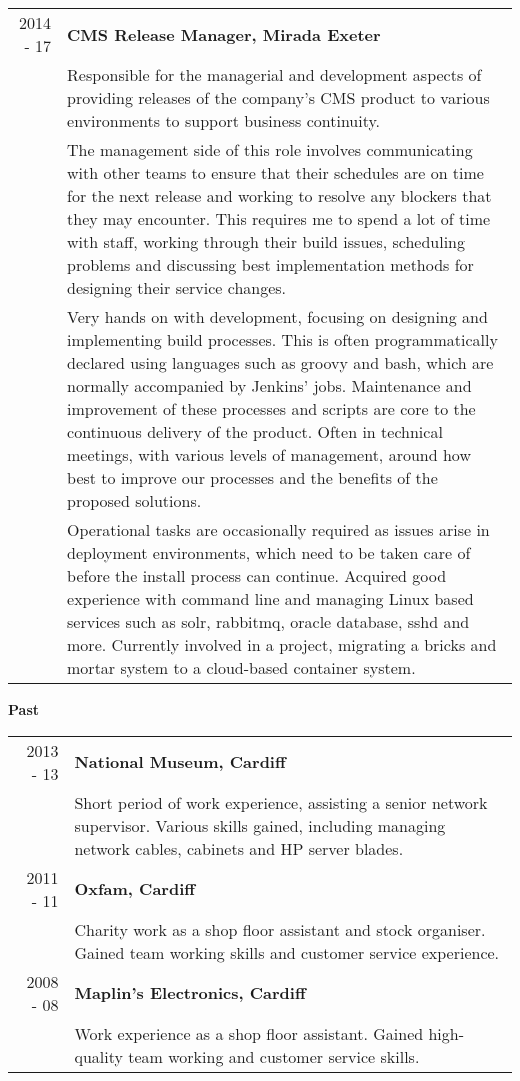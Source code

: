 \documentclass[a4paper,12pt,final,sans]{memoir}
\begin{document}
\begin{longtable}{r p{16cm}}
2014 - 17 & \textbf{\textsf{\color{head} \textsc{CMS} Release Manager, Mirada Exeter}}\\[0.3em]
& Responsible for the managerial and development aspects of providing releases of the company's CMS product to various environments to support business continuity.  \\[0.4em]
    
& The management side of this role involves communicating with other teams to ensure that their schedules are on time for the next release and working to resolve any blockers that they may encounter. This requires me to spend a lot of time with staff, working through their build issues, scheduling problems and discussing best implementation methods for designing their service changes.  \\[0.4em]
    
& Very hands on with development, focusing on designing and implementing build processes. This is often programmatically declared using languages such as groovy and bash, which are normally accompanied by Jenkins' jobs. Maintenance and improvement of these processes and scripts are core to the continuous delivery of the product. Often in technical meetings, with various levels of management, around how best to improve our processes and the benefits of the proposed solutions.  \\[0.4em]

& Operational tasks are occasionally required as issues arise in deployment environments, which need to be taken care of before the install process can continue. Acquired good experience with command line and managing Linux based services such as solr, rabbitmq, oracle database, sshd and more. Currently involved in a project, migrating a bricks and mortar system to a cloud-based container system.
	\\[-1.4em]
	
\end{longtable}

\newpage
\textbf{\textsf{\color{head} Past}} \\[-1.5em]
\begin{longtable}{r p{16cm}}
2013 - 13 & \textbf{\textsf{\color{head} National Museum, Cardiff}}\\[0.3em]
	 & 
	 Short period of work experience, assisting a senior network supervisor. Various skills gained, including managing network cables, cabinets and HP server blades. \\[0.5em]

2011 - 11 & \textbf{\textsf{\color{head} Oxfam, Cardiff}}\\[0.3em]
	 & Charity work as a shop floor assistant and stock organiser. Gained team working skills and customer service experience. \\[0.5em]

2008 - 08 & \textbf{\textsf{\color{head} Maplin’s Electronics, Cardiff}}\\[0.3em]
	 & Work experience as a shop floor assistant. Gained high-quality team working and customer service skills.\\
\end{longtable}
\end{document}
